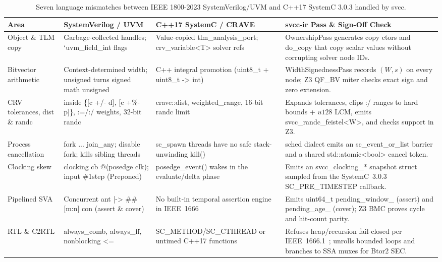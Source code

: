 \documentclass[conference]{IEEEtran}
\newcommand{\code}[1]{{\fontshape{n}\ttfamily #1}}
\begin{document}
\begin{table}[t]
\centering
\caption{Seven language mismatches between IEEE 1800-2023 SystemVerilog/UVM and C++17 SystemC 3.0.3 handled by \code{svcc}.}
\label{tab:impedance}
\footnotesize
\begin{tabularx}{\textwidth}{@{}>{\raggedright\arraybackslash}p{1.00in} >{\raggedright\arraybackslash}p{1.52in} >{\raggedright\arraybackslash}p{1.52in} >{\raggedright\arraybackslash}X@{}}
\toprule
\textbf{Area} & \textbf{SystemVerilog / UVM} & \textbf{C++17 SystemC / CRAVE} & \textbf{\code{svcc-ir} Pass \& Sign-Off Check} \\
\midrule
Object \& TLM copy & Garbage-collected handles; \code{`uvm\_field\_int} flags & Value-copied \code{tlm\_analysis\_port}; \code{crv\_variable<T>} solver refs & \code{OwnershipPass} generates copy ctors and \code{do\_copy} that copy scalar values without corrupting solver node IDs. \\
Bitvector arithmetic & Context-determined width; unsigned turns signed math unsigned & C++ integral promotion (\code{uint8\_t + uint8\_t -> int}) & \code{WidthSignednessPass} records $(W, s)$ on every node; Z3 \code{QF\_BV} miter checks exact sign and zero extension. \\
CRV tolerances, \code{dist} \& \code{randc} & \code{inside \{[c +/- d], [c +\%- p]\}}, \code{:=}/\code{:/} weights, 32-bit \code{randc} & \code{crave::dist}, \code{weighted\_range}, 16-bit \code{randc} limit & Expands tolerances, clips \code{:/} ranges to hard bounds + $u128$ LCM, emits \code{svcc\_randc\_feistel<W>}, and checks support in Z3. \\
Process cancellation & \code{fork ... join\_any; disable fork;} kills sibling threads & \code{sc\_spawn} threads have no safe stack-unwinding \code{kill()} & \code{sched} dialect emits an \code{sc\_event\_or\_list} barrier and a shared \code{std::atomic<bool>} cancel token. \\
Clocking skew & \code{clocking cb @(posedge clk); input \#1step} (Preponed) & \code{posedge\_event()} wakes in the evaluate/delta phase & Emits an \code{svcc\_clocking\_*} snapshot struct sampled from the SystemC~3.0.3 \code{SC\_PRE\_TIMESTEP} callback. \\
Pipelined SVA & Concurrent \code{ant |-> \#\#[m:n] con} (\code{assert} \& \code{cover}) & No built-in temporal assertion engine in IEEE~1666 & Emits \code{uint64\_t pending\_window\_} (\code{assert}) and \code{pending\_age\_} (\code{cover}); Z3 BMC proves cycle and hit-count parity. \\
RTL \& C2RTL & \code{always\_comb}, \code{always\_ff}, nonblocking \code{<=} & \code{SC\_METHOD}/\code{SC\_CTHREAD} or untimed C++17 functions & Refuses heap/recursion fail-closed per IEEE~1666.1~\cite{ieee1666_1_2016}; unrolls bounded loops and branches to SSA muxes for Btor2 SEC. \\
\bottomrule
\end{tabularx}
\end{table}
\end{document}

